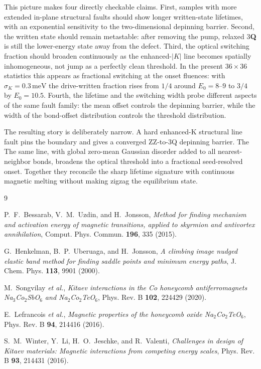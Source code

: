 \documentclass[aps,prb,twocolumn,superscriptaddress,floatfix,nofootinbib]{revtex4-2}
\newcommand{\threeQ}{3\textbf{Q}}
\newcommand{\meV}{\,\mathrm{meV}}
\begin{document}
This picture makes four directly checkable claims.  First, samples with more
extended in-plane structural faults should show longer written-state lifetimes,
with an exponential sensitivity to the two-dimensional depinning barrier.  Second,
the written state should remain metastable: after removing the pump, relaxed \threeQ{}
is still the lower-energy state away from the defect.  Third, the optical
switching fraction should broaden continuously as the enhanced-$|K|$ line becomes
spatially inhomogeneous, not jump as a perfectly clean threshold.  In the present
$36\times36$ statistics this appears as fractional switching at the onset
fluences: with $\sigma_K=0.3\meV$ the drive-written fraction rises from $1/4$
around $E_0=8$--$9$ to $3/4$ by $E_0=10.5$.  Fourth, the
lifetime and the switching width probe different aspects of the same fault
family: the mean offset controls the depinning barrier, while the width of the
bond-offset distribution controls the threshold distribution.

The resulting story is deliberately narrow.  A hard enhanced-K structural line
fault pins the boundary and gives a converged ZZ-to-3Q depinning barrier.  The
The same line, with global zero-mean Gaussian disorder added to all
nearest-neighbor bonds, broadens the optical threshold into a fractional
seed-resolved onset.  Together they reconcile the sharp lifetime
signature with continuous magnetic melting without making zigzag the equilibrium
state.

\begin{thebibliography}{9}

P.~F.~Bessarab, V.~M.~Uzdin, and H.~Jonsson,
\textit{Method for finding mechanism and activation energy of magnetic
transitions, applied to skyrmion and antivortex annihilation},
Comput. Phys. Commun. \textbf{196}, 335 (2015).

G.~Henkelman, B.~P.~Uberuaga, and H.~Jonsson,
\textit{A climbing image nudged elastic band method for finding saddle points
and minimum energy paths},
J. Chem. Phys. \textbf{113}, 9901 (2000).

M.~Songvilay \emph{et al.},
\textit{Kitaev interactions in the Co honeycomb antiferromagnets
Na$_3$Co$_2$SbO$_6$ and Na$_2$Co$_2$TeO$_6$},
Phys. Rev. B \textbf{102}, 224429 (2020).

E.~Lefrancois \emph{et al.},
\textit{Magnetic properties of the honeycomb oxide Na$_2$Co$_2$TeO$_6$},
Phys. Rev. B \textbf{94}, 214416 (2016).

S.~M.~Winter, Y.~Li, H.~O.~Jeschke, and R.~Valenti,
\textit{Challenges in design of Kitaev materials: Magnetic interactions from
competing energy scales},
Phys. Rev. B \textbf{93}, 214431 (2016).

\end{thebibliography}
\end{document}
